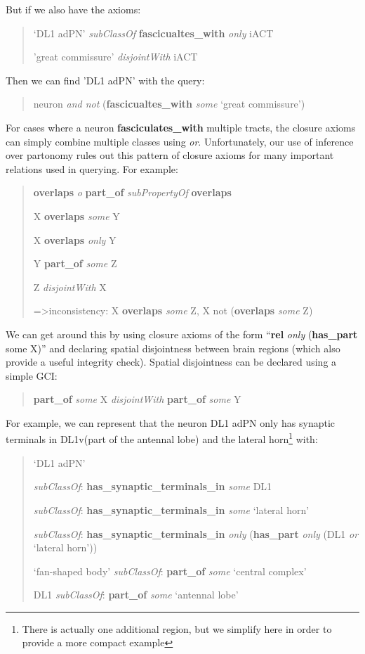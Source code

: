 \documentclass[runningheads,a4paper]{llncs}
\begin{document}
But if we also have the axioms:

\begin{quote}
`DL1 adPN' \textit{subClassOf} \textbf{fascicualtes\_with} \textit{only} iACT

'great commissure' \textit{disjointWith} iACT
\end{quote}

Then we can find 'DL1 adPN' with the query:
\begin{quote}
	neuron \textit{and not} (\textbf{fascicualtes\_with} \textit{some} `great commissure')
\end{quote}

For cases where a neuron \textbf{fasciculates\_with} multiple tracts, the
closure axioms can simply combine multiple classes using
\textit{or}. Unfortunately, our use of inference over partonomy rules out
this pattern of closure axioms for many important relations used in querying.  For example:

\begin{quote}
\textbf{overlaps} \textit{o} \textbf{part\_of} \textit{subPropertyOf}
\textbf{overlaps}

X \textbf{overlaps} \textit{some} Y

X \textbf{overlaps} \textit{only} Y

Y \textbf{part\_of} \textit{some} Z

Z \textit{disjointWith} X

=\textgreater inconsistency: X \textbf{overlaps} \textit{some} Z, X not (\textbf{overlaps}
\textit{some} Z)
\end{quote}


We can get around this by using closure axioms of the form
``\textbf{rel} \textit{only} (\textbf{has\_part} some X)'' and declaring spatial
disjointness between brain regions (which also provide a useful
integrity check). Spatial disjointness can be declared using a simple
GCI:

\begin{quote}
\textbf{part\_of} \textit{some} X \textit{disjointWith} \textbf{part\_of} \textit{some} Y
\end{quote}

For example, we can represent that the neuron DL1 adPN only has
synaptic terminals in DL1v(part of the antennal lobe) and the lateral
horn\footnote{There is  actually one additional region, but we
  simplify here in order to  provide a more compact example} with:

\begin{quote}
`DL1 adPN'

\textit{subClassOf}: \textbf{has\_synaptic\_terminals\_in}
\textit{some} DL1

\textit{subClassOf}: \textbf{has\_synaptic\_terminals\_in}
\textit{some} `lateral horn'

\textit{subClassOf}: \textbf{has\_synaptic\_terminals\_in}
\textit{only} (\textbf{has\_part} \textit{only} (DL1 \textit{or}
`lateral horn'))

`fan-shaped body' \textit{subClassOf}: \textbf{part\_of} \textit{some}
`central complex'

DL1 \textit{subClassOf}: \textbf{part\_of} \textit{some} `antennal lobe'
\end{quote}
\end{document}
